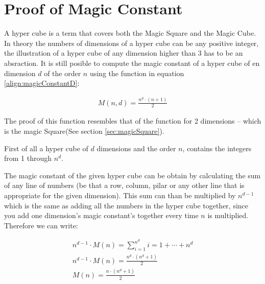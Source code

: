 \section{Proof of Magic Constant}
\label{sec:proofOfMagicConstant}
A hyper cube \cite{Heinz10} is a term that covers both the Magic Square and the Magic Cube. In theory the numbers of dimensions of a hyper cube can be any positive integer, the illustration of a hyper cube of any dimension higher than 3 has to be an absraction. It is still posible to compute the magic constant of a hyper cube of en dimension $d$ of the order $n$ using the function in equation \ref{align:magicConstantD}:

\begin{align}
\label{align:magicConstantD}
	M \left( n,d \right) = \frac{n^d \cdot \left( n+1 \right)}{2}
\end{align}

The proof of this function resembles that of the function for 2 dimensions -- which is the magic Square(See section \ref{sec:magicSquare}).

First of all a hyper cube of $d$ dimensions and the order $n$, contains the integers from 1 through $n^d$.

The magic constant of the given hyper cube can be obtain by calculating the sum of any line of numbers (be that a row, column, pilar or any other line that is appropriate for the given dimension). This sum can than be multiplied by $n^{d-1}$ which is the same as adding all the numbers in the hyper cube together, since you add one dimension's magic constant's together every time $n$ is multiplied. Therefore we can write:

\begin{align}
	n^{d-1} \cdot M \left( n \right) = \sum ^{n^d}_{i = 1} i = 1 + \cdots + n^d \\
	n^{d-1} \cdot M \left( n \right) = \frac{n^d \cdot \left( n^d + 1 \right)}{2} \\
	M \left( n \right) = \frac{n \cdot \left( n^d + 1 \right)}{2}
\end{align}